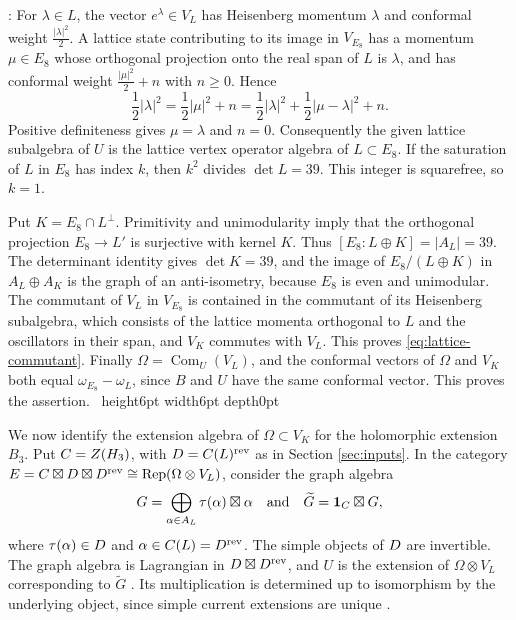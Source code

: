 \documentclass[leqno]{article}
\let\cal\relax
\newcommand{\cal}{\mathcal}
\renewcommand{\geq}{\ensuremath{\geqslant}}
\newcommand{\qed}{\hfill \vrule height6pt  width6pt depth0pt}
\newcommand{\ot}{\otimes}
\DeclareMathOperator{\Rep}{Rep}
\newenvironment{proof}[1][]{\noindent {\it Proof #1} : }{\hbox{~}\qed
\smallskip
}
\numberwithin{equation}{section}
\begin{document}
\begin{proof}
For $\lambda \in L$, the vector $e^\lambda \in V_L$ has Heisenberg momentum $\lambda$ and conformal weight $\frac{|\lambda|^2}{2}$. A lattice state contributing to its image in $V_{E_8}$ has a momentum $\mu \in E_8$ whose orthogonal projection onto the real span of $L$ is $\lambda$, and has conformal weight $\frac{|\mu|^2}{2}+n$ with $n \geq 0$. Hence
\[
\frac{1}{2}|\lambda|^2 = \frac{1}{2}|\mu|^2+n
= \frac{1}{2}|\lambda|^2+\frac{1}{2}|\mu-\lambda|^2+n.
\]
Positive definiteness gives $\mu = \lambda$ and $n = 0$. Consequently the given lattice subalgebra of $U$ is the lattice vertex operator algebra of $L \subset E_8$. If the saturation of $L$ in $E_8$ has index $k$, then $k^2$ divides $\det L = 39$. This integer is squarefree, so $k = 1$.

Put $K = E_8 \cap L^\perp$. Primitivity and unimodularity imply that the orthogonal projection $E_8 \to L'$ is surjective with kernel $K$. Thus $[E_8:L \oplus K] = |A_L| = 39$. The determinant identity gives $\det K = 39$, and the image of $E_8/(L \oplus K)$ in $A_L \oplus A_K$ is the graph of an anti-isometry, because $E_8$ is even and unimodular. The commutant of $V_L$ in $V_{E_8}$ is contained in the commutant of its Heisenberg subalgebra, which consists of the lattice momenta orthogonal to $L$ and the oscillators in their span, and $V_K$ commutes with $V_L$. This proves \eqref{eq:lattice-commutant}. Finally $\Omega = \operatorname{Com}_U(V_L)$, and the conformal vectors of $\Omega$ and $V_K$ both equal $\omega_{E_8}-\omega_L$, since $B$ and $U$ have the same conformal vector. This proves the assertion.
\end{proof}

We now identify the extension algebra of $\Omega \subset V_K$ for the holomorphic extension $B_3$. Put $\cal C = Z(\cal H_3)$, with $\cal D = \cal C(L)^{\mathrm{rev}}$ as in Section \ref{sec:inputs}. In the category
$\cal E = \cal C \boxtimes \cal D \boxtimes \cal D^{\mathrm{rev}} \cong \Rep(\Omega \ot V_L)$, consider the graph algebra
\[
G = \bigoplus_{\alpha \in A_L} \tau(\alpha) \boxtimes \alpha
\quad\text{and}\quad \widetilde G = \mathbf 1_{\cal C} \boxtimes G,
\]
where $\tau(\alpha) \in \cal D$ and $\alpha \in \cal C(L) = \cal D^{\mathrm{rev}}$. The simple objects of $\cal D$ are invertible. The graph algebra is Lagrangian in $\cal D \boxtimes \cal D^{\mathrm{rev}}$, and $U$ is the extension of $\Omega \ot V_L$ corresponding to $\widetilde G$ \cite{HKL15}. Its multiplication is determined up to isomorphism by the underlying object, since simple current extensions are unique \cite[Proposition 5.3]{DoM04}.
\end{document}
